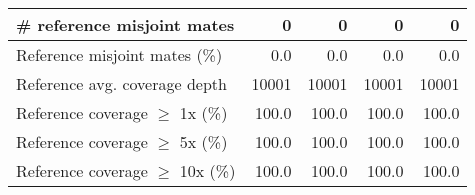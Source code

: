 \documentclass[12pt,a4paper]{article}
\begin{document}
\begin{table}[ht]
\begin{center}
\begin{tabular}{|l*{4}{|r}|}
\# reference misjoint mates & 0 & 0 & 0 & 0 \\ \hline
Reference misjoint mates (\%) & 0.0 & 0.0 & 0.0 & 0.0 \\ \hline
Reference avg. coverage depth & 10001 & 10001 & 10001 & 10001 \\ \hline
Reference coverage $\geq$ 1x (\%) & 100.0 & 100.0 & 100.0 & 100.0 \\ \hline
Reference coverage $\geq$ 5x (\%) & 100.0 & 100.0 & 100.0 & 100.0 \\ \hline
Reference coverage $\geq$ 10x (\%) & 100.0 & 100.0 & 100.0 & 100.0 \\ \hline
\end{tabular}
\end{center}
\end{table}
\end{document}
